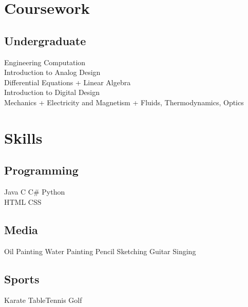 \documentclass[]{deedy-resume-openfont}
\begin{document}
\begin{minipage}[t]{0.31\textwidth}
\section{Coursework}

\subsection{Undergraduate}
\textbullet Engineering Computation \\
\textbullet Introduction to Analog Design \\
\textbullet Differential Equations + Linear Algebra \\
\textbullet Introduction to Digital Design \\
\textbullet Mechanics + Electricity and Magnetism + Fluids, Thermodynamics, Optics \\
\sectionsep


\section{Skills}
\subsection{Programming}
Java \textbullet{} C \textbullet{} C\# \textbullet{} Python \\
HTML \textbullet{} CSS \\
\sectionsep
\subsection{Media}
Oil Painting \textbullet{} Water Painting \textbullet{} Pencil Sketching 
\textbullet{} Guitar \textbullet{} Singing\\
\sectionsep
\subsection{Sports}
Karate \textbullet{} Table\-Tennis \textbullet{} Golf\\
\sectionsep
%
%

\end{minipage} 
\hfill
\end{document}
